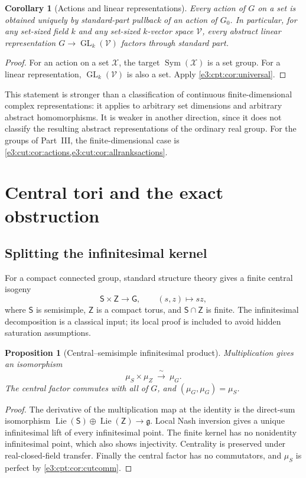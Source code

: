 \documentclass[11pt,letterpaper]{article}
\numberwithin{equation}{section}
\newtheorem{proposition}[proposition]{Proposition}
\newtheorem{corollary}[corollary]{Corollary}
\theoremstyle{definition}
\theoremstyle{remark}
\newcommand{\GL}{\operatorname{GL}}
\newcommand{\comm}[2]{\left(#1,#2\right)}
\newcommand{\Sym}{\operatorname{Sym}}
\newcommand{\Lie}{\operatorname{Lie}}
\newcommand{\sG}{\mathsf G}
\newcommand{\sS}{\mathsf S}
\newcommand{\sZ}{\mathsf Z}
\begin{document}
\begin{corollary}[Actions and linear representations]\label{e3:cpt:cor:actions}
Every action of $G$ on a set is obtained uniquely by standard-part pullback of an
action of $G_0$. In particular, for any set-sized field $k$ and any set-sized
$k$-vector space $\mathcal V$, every abstract linear representation
$G\to\GL_k(\mathcal V)$ factors through standard part.
\end{corollary}
\begin{proof}
For an action on a set $\mathcal X$, the target $\Sym(\mathcal X)$ is a set
group. For a linear representation, $\GL_k(\mathcal V)$ is also a set. Apply
\cref{e3:cpt:cor:universal}.
\end{proof}

This statement is stronger than a classification of continuous
finite-dimensional complex representations: it applies to arbitrary set
dimensions and arbitrary abstract homomorphisms. It is weaker in another
direction, since it does not classify the resulting abstract representations of
the ordinary real group. For the groups of Part~III, the finite-dimensional case
is \cref{e3:cut:cor:actions,e3:cut:cor:allranksactions}.

\section{Central tori and the exact obstruction}\label{e3:cpt:sec:central}

\subsection{Splitting the infinitesimal kernel}

For a compact connected group, standard structure theory gives a finite central
isogeny
\[
 \sS\times\sZ\longrightarrow\sG,
 \qquad(s,z)\longmapsto sz,
\]
where $\sS$ is semisimple, $\sZ$ is a compact torus, and $\sS\cap\sZ$ is finite.
The infinitesimal decomposition is a classical input; its local proof is
included to avoid hidden saturation assumptions.

\begin{proposition}[Central--semisimple infinitesimal product]\label{e3:cpt:prop:centralproduct}
Multiplication gives an isomorphism
\begin{equation}\label{e3:cpt:eq:centralproduct}
 \mu_S\times\mu_Z\ \xrightarrow{\ \sim\ }\ \mu_G.
\end{equation}
The central factor commutes with all of $G$, and
$\comm{\mu_G}{\mu_G}=\mu_S$.
\end{proposition}
\begin{proof}
The derivative of the multiplication map at the identity is the direct-sum
isomorphism $\Lie(\sS)\oplus\Lie(\sZ)\to\mathfrak g$. Local Nash inversion gives
a unique infinitesimal lift of every infinitesimal point. The finite kernel has
no nonidentity infinitesimal point, which also shows injectivity. Centrality is
preserved under real-closed-field transfer. Finally the central factor has no
commutators, and $\mu_S$ is perfect by \cref{e3:cpt:cor:cutcomm}.
\end{proof}
\end{document}
